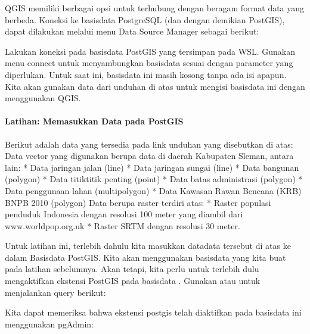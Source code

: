 \documentclass[letterpaper,10pt,english]{sphinxmanual}
\begin{document}
QGIS memiliki berbagai opsi untuk terhubung dengan beragam format data yang berbeda. Koneksi ke basisdata PostgreSQL (dan dengan demikian PostGIS), dapat dilakukan melalui menu Data Source Manager sebagai berikut:


Lakukan koneksi pada basisdata PostGIS yang tersimpan pada WSL. Gunakan menu connect untuk menyambungkan basisdata sesuai dengan parameter yang diperlukan. Untuk saat ini, basisdata ini masih kosong tanpa ada isi apapun. Kita akan gunakan data dari unduhan di atas untuk mengisi basisdata ini dengan menggunakan QGIS.


\paragraph{Latihan: Memasukkan Data pada PostGIS}
\label{\detokenize{sesi2/postgisquery:latihan-memasukkan-data-pada-postgis}}
Berikut adalah data yang tersedia pada link unduhan yang disebutkan di atas:
Data vector yang digunakan berupa data di daerah Kabupaten Sleman, antara lain:
*	Data jaringan jalan (line)
*	Data jaringan sungai (line)
*	Data bangunan (polygon)
*	Data titik\sphinxhyphen{}titik penting (point)
*	Data batas administrasi (polygon)
*	Data penggunaan lahan (multipolygon)
*	Data Kawasan Rawan Bencana (KRB) BNPB 2010 (polygon)
Data berupa raster terdiri atas:
*	Raster populasi penduduk Indonesia dengan resolusi 100 meter yang diambil dari www.worldpop.org.uk
*	Raster SRTM dengan resolusi 30 meter.

Untuk latihan ini, terlebih dahulu kita masukkan data\sphinxhyphen{}data tersebut di atas ke dalam Basisdata PostGIS. Kita akan menggunakan basisdata  yang kita buat pada latihan sebelumnya. Akan tetapi, kita perlu untuk terlebih dulu mengaktifkan ekstensi PostGIS pada basisdata . Gunakan  atau  untuk menjalankan query berikut:

\begin{sphinxVerbatim}[commandchars=\\\{\}]
  
\end{sphinxVerbatim}

Kita dapat memeriksa bahwa ekstensi postgis telah diaktifkan pada basisdata ini menggunakan pgAdmin:

\end{document}
